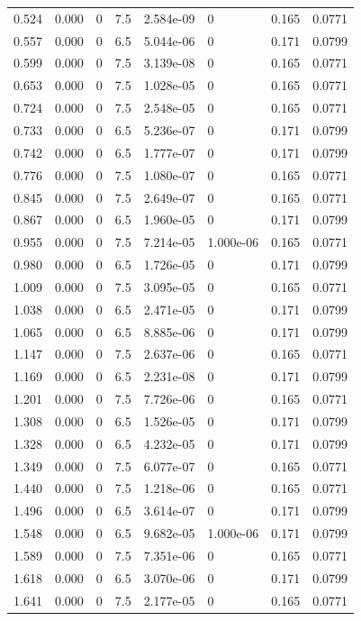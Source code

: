 \documentclass[preview]{standalone}
\begin{document}
{{\begin{tabular}{L{1.2cm}C{1.2cm} C{0.3cm}C{0.5cm} C{1.4cm}C{1.4cm} C{1.4cm}C{1.4cm}}
  0.524  &  0.000  & 0     & 7.5 &  2.584e-09  & 0  & 0.165 &  0.0771   \\ 
  0.557  &  0.000  & 0     & 6.5 &  5.044e-06  & 0  & 0.171 &  0.0799   \\ 
  0.599  &  0.000  & 0     & 7.5 &  3.139e-08  & 0  & 0.165 &  0.0771   \\ 
  0.653  &  0.000  & 0     & 7.5 &  1.028e-05  & 0  & 0.165 &  0.0771   \\ 
  0.724  &  0.000  & 0     & 7.5 &  2.548e-05  & 0  & 0.165 &  0.0771   \\ 
  0.733  &  0.000  & 0     & 6.5 &  5.236e-07  & 0  & 0.171 &  0.0799   \\ 
  0.742  &  0.000  & 0     & 6.5 &  1.777e-07  & 0  & 0.171 &  0.0799   \\ 
  0.776  &  0.000  & 0     & 7.5 &  1.080e-07  & 0  & 0.165 &  0.0771   \\ 
  0.845  &  0.000  & 0     & 7.5 &  2.649e-07  & 0  & 0.165 &  0.0771   \\ 
  0.867  &  0.000  & 0     & 6.5 &  1.960e-05  & 0  & 0.171 &  0.0799   \\ 
  0.955  &  0.000  & 0     & 7.5 &  7.214e-05  & 1.000e-06  & 0.165 &  0.0771   \\ 
  0.980  &  0.000  & 0     & 6.5 &  1.726e-05  & 0  & 0.171 &  0.0799   \\ 
  1.009  &  0.000  & 0     & 7.5 &  3.095e-05  & 0  & 0.165 &  0.0771   \\ 
  1.038  &  0.000  & 0     & 6.5 &  2.471e-05  & 0  & 0.171 &  0.0799   \\ 
  1.065  &  0.000  & 0     & 6.5 &  8.885e-06  & 0  & 0.171 &  0.0799   \\ 
  1.147  &  0.000  & 0     & 7.5 &  2.637e-06  & 0  & 0.165 &  0.0771   \\ 
  1.169  &  0.000  & 0     & 6.5 &  2.231e-08  & 0  & 0.171 &  0.0799   \\ 
  1.201  &  0.000  & 0     & 7.5 &  7.726e-06  & 0  & 0.165 &  0.0771   \\ 
  1.308  &  0.000  & 0     & 6.5 &  1.526e-05  & 0  & 0.171 &  0.0799   \\ 
  1.328  &  0.000  & 0     & 6.5 &  4.232e-05  & 0  & 0.171 &  0.0799   \\ 
  1.349  &  0.000  & 0     & 7.5 &  6.077e-07  & 0  & 0.165 &  0.0771   \\ 
  1.440  &  0.000  & 0     & 7.5 &  1.218e-06  & 0  & 0.165 &  0.0771   \\ 
  1.496  &  0.000  & 0     & 6.5 &  3.614e-07  & 0  & 0.171 &  0.0799   \\ 
  1.548  &  0.000  & 0     & 6.5 &  9.682e-05  & 1.000e-06  & 0.171 &  0.0799   \\ 
  1.589  &  0.000  & 0     & 7.5 &  7.351e-06  & 0  & 0.165 &  0.0771   \\ 
  1.618  &  0.000  & 0     & 6.5 &  3.070e-06  & 0  & 0.171 &  0.0799   \\ 
  1.641  &  0.000  & 0     & 7.5 &  2.177e-05  & 0  & 0.165 &  0.0771   \\ 
\hline 
\end{tabular} 

}}
\end{document}
